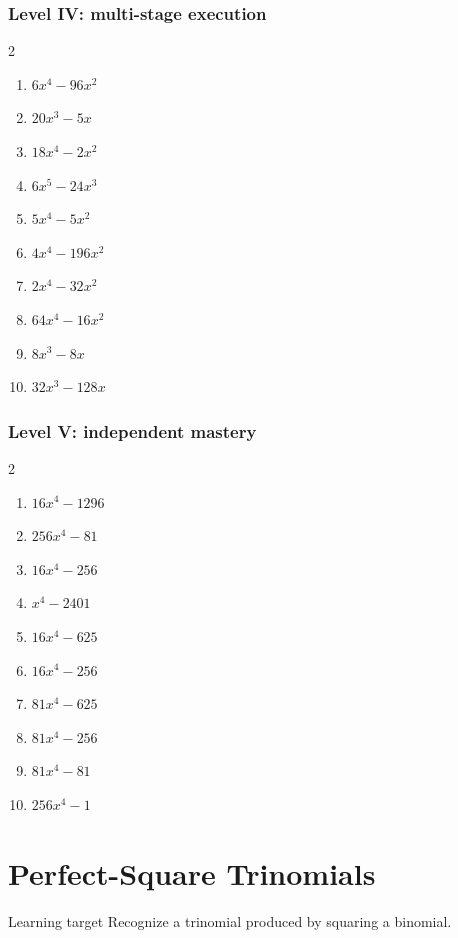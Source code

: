 \documentclass[11pt,oneside]{book}
\begin{document}
\subsection*{Level IV: multi-stage execution}
\begin{multicols}{2}
\begin{enumerate}[leftmargin=*,label=\textbf{\arabic*.},itemsep=0.65\baselineskip]
\item $ 6 x^{4} - 96 x^{2} $
\item $ 20 x^{3} - 5 x $
\item $ 18 x^{4} - 2 x^{2} $
\item $ 6 x^{5} - 24 x^{3} $
\item $ 5 x^{4} - 5 x^{2} $
\item $ 4 x^{4} - 196 x^{2} $
\item $ 2 x^{4} - 32 x^{2} $
\item $ 64 x^{4} - 16 x^{2} $
\item $ 8 x^{3} - 8 x $
\item $ 32 x^{3} - 128 x $
\end{enumerate}
\end{multicols}
\subsection*{Level V: independent mastery}
\begin{multicols}{2}
\begin{enumerate}[leftmargin=*,label=\textbf{\arabic*.},itemsep=0.65\baselineskip]
\item $ 16 x^{4} - 1296 $
\item $ 256 x^{4} - 81 $
\item $ 16 x^{4} - 256 $
\item $ x^{4} - 2401 $
\item $ 16 x^{4} - 625 $
\item $ 16 x^{4} - 256 $
\item $ 81 x^{4} - 625 $
\item $ 81 x^{4} - 256 $
\item $ 81 x^{4} - 81 $
\item $ 256 x^{4} - 1 $
\end{enumerate}
\end{multicols}
\chapter{Perfect-Square Trinomials}
\begin{rulebox}{Learning target}
Recognize a trinomial produced by squaring a binomial.
\end{rulebox}
\end{document}
